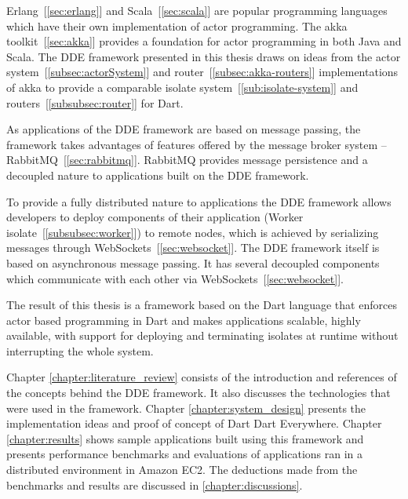   Erlang~[\autoref{sec:erlang}] and Scala~[\autoref{sec:scala}] are popular programming languages which have their own implementation of actor programming. The akka toolkit~[\autoref{sec:akka}] provides a foundation for actor programming in both Java and Scala. The DDE framework presented in this thesis draws on ideas from the actor system~[\autoref{subsec:actorSystem}] and router~[\autoref{subsec:akka-routers}]
   implementations of akka to provide a comparable isolate system~[\autoref{sub:isolate-system}] and routers~[\autoref{subsubsec:router}] for Dart.

  As applications of the DDE framework are based on message passing, the framework takes advantages of features offered by the message broker system – RabbitMQ~[\autoref{sec:rabbitmq}]. RabbitMQ provides message persistence and a decoupled nature to applications built on the DDE framework.

  To provide a fully distributed nature to applications the DDE framework allows developers to deploy components of their application (Worker isolate~[\autoref{subsubsec:worker}]) to remote nodes, which is achieved by serializing messages through WebSockets~[\autoref{sec:websocket}]. The DDE framework itself is based on asynchronous message passing. It has several decoupled components which communicate with each other via WebSockets~[\autoref{sec:websocket}].

  The result of this thesis is a framework based on the Dart language that enforces actor based programming in Dart and makes applications scalable, highly available, with support for deploying and terminating isolates at runtime without interrupting the whole system.

 Chapter \ref{chapter:literature_review} consists of the introduction and references of the concepts behind the DDE framework. It also discusses the technologies that were used in the framework. Chapter \ref{chapter:system_design} presents the implementation ideas and proof of concept of Dart Dart Everywhere. Chapter \ref{chapter:results} shows sample applications built using this framework and presents performance benchmarks and evaluations of applications ran in a distributed environment in Amazon EC2. The deductions made from the benchmarks and results are discussed in \autoref{chapter:discussions}.
